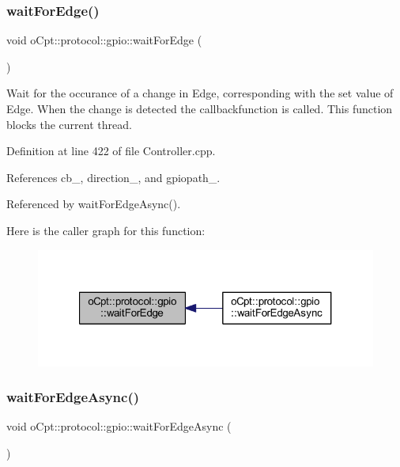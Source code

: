 \subsubsection{\texorpdfstring{wait\+For\+Edge()}{waitForEdge()}}
{\footnotesize\ttfamily void o\+Cpt\+::protocol\+::gpio\+::wait\+For\+Edge (\begin{DoxyParamCaption}{ }\end{DoxyParamCaption})}

Wait for the occurance of a change in Edge, corresponding with the set value of Edge. When the change is detected the callbackfunction is called. This function blocks the current thread. 

Definition at line 422 of file Controller.\+cpp.



References cb\+\_\+, direction\+\_\+, and gpiopath\+\_\+.



Referenced by wait\+For\+Edge\+Async().

Here is the caller graph for this function\+:\nopagebreak
\begin{figure}[H]
\begin{center}
\leavevmode
\includegraphics[width=321pt]{classo_cpt_1_1protocol_1_1gpio_a0fd140f4fb32047ceba4a9a17891efe0_icgraph}
\end{center}
\end{figure}
\hypertarget{classo_cpt_1_1protocol_1_1gpio_a02375f321f838da5f738eda8631ae0cc}{}\label{classo_cpt_1_1protocol_1_1gpio_a02375f321f838da5f738eda8631ae0cc} 
\subsubsection{\texorpdfstring{wait\+For\+Edge\+Async()}{waitForEdgeAsync()}}
{\footnotesize\ttfamily void o\+Cpt\+::protocol\+::gpio\+::wait\+For\+Edge\+Async (\begin{DoxyParamCaption}{ }\end{DoxyParamCaption})}

